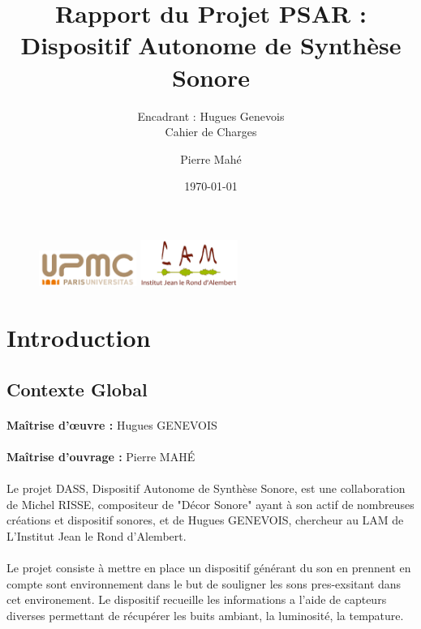 \documentclass[a4paper, titlepage, oneside, 12pt]{article}%
\title{Rapport du Projet PSAR :\\ Dispositif Autonome de Synthèse Sonore}
\subtitle{Encadrant : Hugues Genevois \\ Cahier de Charges}
\author{Pierre Mahé}
\date{\today}
\begin{document}
  
 \begin{figure}[b]
	\includegraphics[width=120px] {upmc_logo.jpg}
	\hspace{7cm}
	\vspace{-2cm}
	\includegraphics[width=120px] {LogoLAM.jpg}
\end{figure}

\maketitle 
\tableofcontents

\newpage
\section{Introduction}
\subsection{Contexte Global}
\paragraph{}
\textbf{Maîtrise d’œuvre :} Hugues GENEVOIS
\vspace{-5mm}
\paragraph{}
\textbf{Maîtrise d’ouvrage :} Pierre MAHÉ

\paragraph{}
Le projet DASS, Dispositif Autonome de Synthèse Sonore, est une collaboration de Michel RISSE, compositeur de "Décor Sonore" ayant à son actif de nombreuses créations et dispositif sonores, et de Hugues GENEVOIS, chercheur au LAM de L'Institut Jean le Rond d'Alembert.

\paragraph{}
Le projet consiste à mettre en place un dispositif générant du son en prennent en compte sont environnement dans le but de souligner les sons pres-exsitant dans cet environement. Le dispositif recueille les informations a l'aide de capteurs diverses permettant de récupérer les buits ambiant, la luminosité, la tempature.
\end{document}
